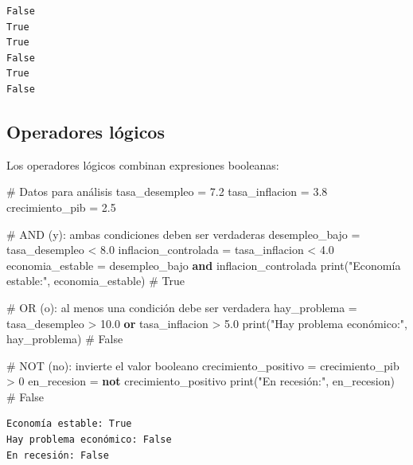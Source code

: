 \documentclass[
  doc,
  floatsintext,
  longtable,
  a4paper,
  nolmodern,
  notxfonts,
  notimes,
  12pt,
  colorlinks=true,linkcolor=blue,citecolor=blue,urlcolor=blue]{apa7}
\newenvironment{Shaded}{\begin{snugshade}}{\end{snugshade}}
\newcommand{\BuiltInTok}[1]{\textcolor[rgb]{0.00,0.23,0.31}{#1}}
\newcommand{\CommentTok}[1]{\textcolor[rgb]{0.37,0.37,0.37}{#1}}
\newcommand{\DecValTok}[1]{\textcolor[rgb]{0.68,0.00,0.00}{#1}}
\newcommand{\FloatTok}[1]{\textcolor[rgb]{0.68,0.00,0.00}{#1}}
\newcommand{\KeywordTok}[1]{\textcolor[rgb]{0.00,0.23,0.31}{\textbf{#1}}}
\newcommand{\NormalTok}[1]{\textcolor[rgb]{0.00,0.23,0.31}{#1}}
\newcommand{\OperatorTok}[1]{\textcolor[rgb]{0.37,0.37,0.37}{#1}}
\newcommand{\StringTok}[1]{\textcolor[rgb]{0.13,0.47,0.30}{#1}}
\begin{document}
\begin{verbatim}
False
True
True
False
True
False
\end{verbatim}

\subsection{Operadores lógicos}\label{operadores-luxf3gicos}

Los operadores lógicos combinan expresiones booleanas:

\begin{Shaded}
\begin{Highlighting}[]
\CommentTok{\# Datos para análisis}
\NormalTok{tasa\_desempleo }\OperatorTok{=} \FloatTok{7.2}
\NormalTok{tasa\_inflacion }\OperatorTok{=} \FloatTok{3.8}
\NormalTok{crecimiento\_pib }\OperatorTok{=} \FloatTok{2.5}

\CommentTok{\# AND (y): ambas condiciones deben ser verdaderas}
\NormalTok{desempleo\_bajo }\OperatorTok{=}\NormalTok{ tasa\_desempleo }\OperatorTok{\textless{}} \FloatTok{8.0}
\NormalTok{inflacion\_controlada }\OperatorTok{=}\NormalTok{ tasa\_inflacion }\OperatorTok{\textless{}} \FloatTok{4.0}
\NormalTok{economia\_estable }\OperatorTok{=}\NormalTok{ desempleo\_bajo }\KeywordTok{and}\NormalTok{ inflacion\_controlada}
\BuiltInTok{print}\NormalTok{(}\StringTok{"Economía estable:"}\NormalTok{, economia\_estable)  }\CommentTok{\# True}

\CommentTok{\# OR (o): al menos una condición debe ser verdadera}
\NormalTok{hay\_problema }\OperatorTok{=}\NormalTok{ tasa\_desempleo }\OperatorTok{\textgreater{}} \FloatTok{10.0} \KeywordTok{or}\NormalTok{ tasa\_inflacion }\OperatorTok{\textgreater{}} \FloatTok{5.0}
\BuiltInTok{print}\NormalTok{(}\StringTok{"Hay problema económico:"}\NormalTok{, hay\_problema)  }\CommentTok{\# False}

\CommentTok{\# NOT (no): invierte el valor booleano}
\NormalTok{crecimiento\_positivo }\OperatorTok{=}\NormalTok{ crecimiento\_pib }\OperatorTok{\textgreater{}} \DecValTok{0}
\NormalTok{en\_recesion }\OperatorTok{=} \KeywordTok{not}\NormalTok{ crecimiento\_positivo}
\BuiltInTok{print}\NormalTok{(}\StringTok{"En recesión:"}\NormalTok{, en\_recesion)  }\CommentTok{\# False}
\end{Highlighting}
\end{Shaded}

\begin{verbatim}
Economía estable: True
Hay problema económico: False
En recesión: False
\end{verbatim}
\end{document}
